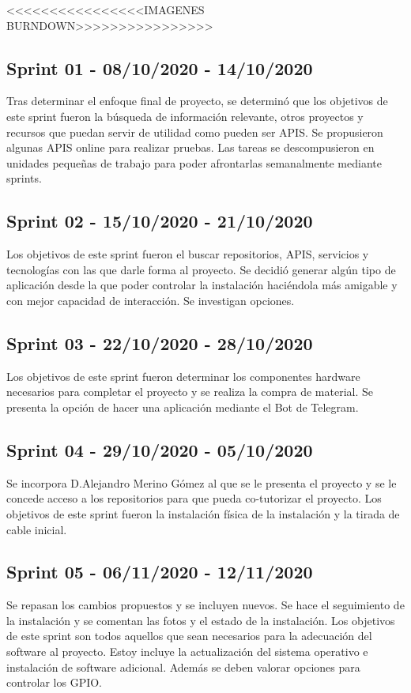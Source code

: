 <<<<<<<<<<<<<<<<IMAGENES BURNDOWN>>>>>>>>>>>>>>>>

\subsection{Sprint 01 - 08/10/2020 - 14/10/2020}
Tras determinar el enfoque final de proyecto, se determinó que los objetivos de este sprint fueron la búsqueda de información relevante, otros proyectos y recursos que puedan servir de utilidad como pueden ser APIS. Se propusieron algunas APIS online para realizar pruebas.
Las tareas se descompusieron en unidades pequeñas de trabajo para poder afrontarlas semanalmente mediante sprints.

\subsection{Sprint 02 - 15/10/2020 - 21/10/2020}
Los objetivos de este sprint fueron el buscar repositorios, APIS, servicios y tecnologías con las que darle forma al proyecto. Se decidió generar algún tipo de aplicación desde la que poder controlar la instalación haciéndola más amigable y con mejor capacidad de interacción. Se investigan opciones.

\subsection{Sprint 03 - 22/10/2020 - 28/10/2020}
Los objetivos de este sprint fueron determinar los componentes hardware necesarios para completar el proyecto y se realiza la compra de material.
Se presenta la opción de hacer una aplicación mediante el Bot de Telegram.

\subsection{Sprint 04 - 29/10/2020 - 05/10/2020}
Se incorpora D.Alejandro Merino Gómez al que se le presenta el proyecto y se le concede acceso a los repositorios para que pueda co-tutorizar el proyecto.
Los objetivos de este sprint fueron la instalación física de la instalación y la tirada de cable inicial.

\subsection{Sprint 05 - 06/11/2020 - 12/11/2020}
Se repasan los cambios propuestos y se incluyen nuevos. Se hace el seguimiento de la instalación y se comentan las fotos y el estado de la instalación.
Los objetivos de este sprint son todos aquellos que sean necesarios para la adecuación del software al proyecto. Estoy incluye la actualización del sistema operativo e instalación de software adicional. Además se deben valorar opciones para controlar los GPIO.

